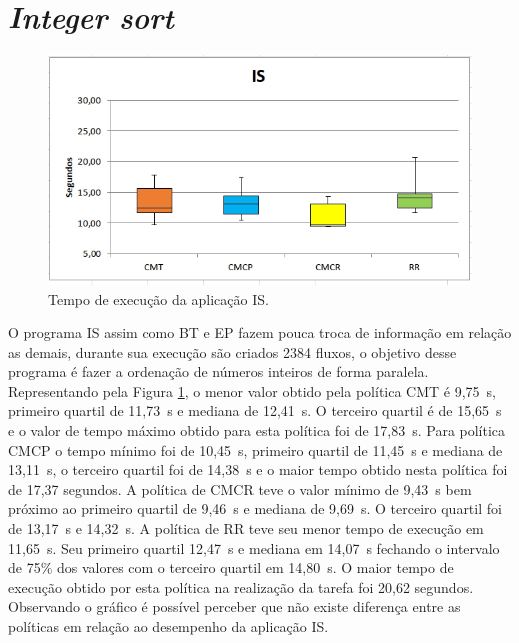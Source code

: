 \section{\textit{Integer sort}}
\label{sec:is}
\begin{figure}[!htb]
	\caption{\label{fig:is}Tempo de execução da aplicação IS.}
	\begin{center}
	    \includegraphics[scale=0.60]{imagens/is.jpg}
	\end{center}
\end{figure}

O programa IS assim como BT e EP fazem pouca troca de informação em relação as demais, durante sua execução são criados 2384 fluxos, o objetivo desse programa é fazer a ordenação de números inteiros de forma paralela. Representando pela Figura \ref{fig:is}, o menor valor obtido pela política CMT é 9,75~s, primeiro quartil de 11,73~s e mediana de 12,41~s. O terceiro quartil é de 15,65~s e o valor de tempo máximo obtido para esta política foi de 17,83~s. Para política CMCP o tempo mínimo foi de 10,45~s, primeiro quartil de 11,45~s e mediana de 13,11~s, o terceiro quartil foi de 14,38~s e o maior tempo obtido nesta política foi de 17,37 segundos. A política de CMCR teve o valor mínimo de 9,43~s bem próximo ao primeiro quartil de 9,46~s e mediana de 9,69~s. O terceiro quartil foi de 13,17~s e 14,32~s. A política de RR teve seu menor tempo de execução em 11,65~s. Seu primeiro quartil 12,47~s e mediana em 14,07~s fechando o intervalo de 75\% dos valores com o terceiro quartil em 14,80~s.  O maior tempo de execução obtido por esta política na realização da tarefa foi 20,62 segundos. Observando o gráfico é possível perceber que não existe diferença entre as políticas em relação ao desempenho da aplicação IS. 

